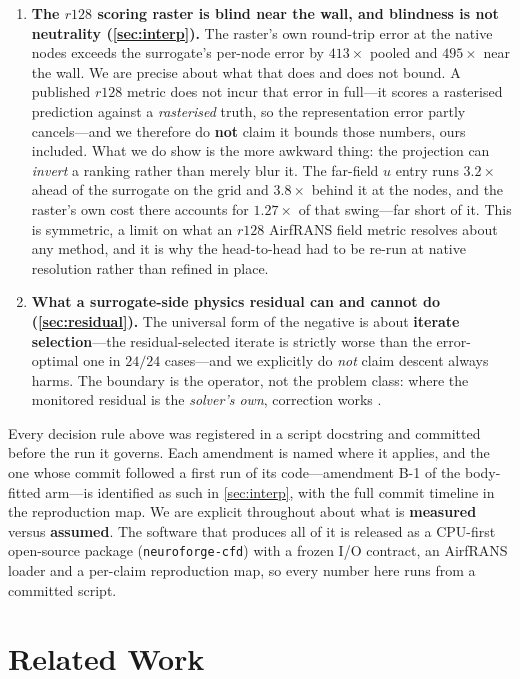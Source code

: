 \begin{enumerate}
\item \textbf{The $r128$ scoring raster is blind near the wall, and blindness is not
neutrality (\autoref{sec:interp}).} The raster's own round-trip error at the native nodes
exceeds the surrogate's per-node error by $413\times$ pooled and $495\times$ near the wall.
We are precise about what that does and does not bound. A published $r128$ metric does not
incur that error in full---it scores a rasterised prediction against a \emph{rasterised}
truth, so the representation error partly cancels---and we therefore do \textbf{not} claim
it bounds those numbers, ours included. What we do show is the more awkward thing: the
projection can \emph{invert} a ranking rather than merely blur it. The far-field $u$ entry
runs $3.2\times$ ahead of the surrogate on the grid and $3.8\times$ behind it at the nodes,
and the raster's own cost there accounts for $1.27\times$ of that swing---far short of it.
This is symmetric, a limit on what an $r128$ AirfRANS field metric resolves about any
method, and it is why the head-to-head had to be re-run at native resolution rather than
refined in place.

\item \textbf{What a surrogate-side physics residual can and cannot do
(\autoref{sec:residual}).} The universal form of the negative is about \textbf{iterate
selection}---the residual-selected iterate is strictly worse than the error-optimal one in
$24/24$ cases---and we explicitly do \emph{not} claim descent always harms. The boundary is
the operator, not the problem class: where the monitored residual is the \emph{solver's
own}, correction works \citep{lei2026newtonkrylov}.
\end{enumerate}

Every decision rule above was registered in a script docstring and committed before the
run it governs. Each amendment is named where it applies, and the one whose commit
followed a first run of its code---amendment B-1 of the body-fitted arm---is identified
as such in \autoref{sec:interp}, with the full commit timeline in the reproduction map. We are
explicit throughout about what is \textbf{measured} versus \textbf{assumed}. The software
that produces all of it is released as a CPU-first open-source package
(\texttt{neuroforge-cfd}) with a frozen I/O contract, an AirfRANS loader and a
per-claim reproduction map, so every number here runs from a committed script.

\section{Related Work}

